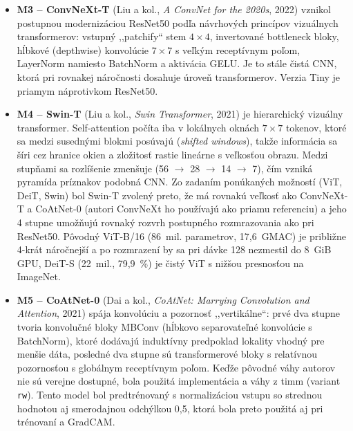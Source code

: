 \begin{itemize}
    \item \textbf{M3 -- ConvNeXt-T} (Liu a kol., \emph{A ConvNet for the
          2020s}, 2022) vznikol postupnou modernizáciou ResNet50 podľa
          návrhových princípov vizuálnych transformerov: vstupný
          ,,patchify`` stem $4\times4$, invertované bottleneck bloky,
          hĺbkové (depthwise) konvolúcie $7\times7$ s veľkým receptívnym
          poľom, LayerNorm namiesto BatchNorm a aktivácia GELU. Je to stále
          čistá CNN, ktorá pri rovnakej náročnosti dosahuje úroveň
          transformerov. Verzia Tiny je priamym náprotivkom ResNet50.
    \item \textbf{M4 -- Swin-T} (Liu a kol., \emph{Swin Transformer}, 2021)
          je hierarchický vizuálny transformer. Self-attention počíta iba
          v lokálnych oknách $7\times7$ tokenov, ktoré sa medzi
          susednými blokmi posúvajú (\emph{shifted windows}), takže
          informácia sa šíri cez hranice okien a zložitosť rastie lineárne
          s veľkosťou obrazu. Medzi stupňami sa rozlíšenie zmenšuje
          (56 $\rightarrow$ 28 $\rightarrow$ 14 $\rightarrow$ 7), čím vzniká
          pyramída príznakov podobná CNN. Zo zadaním ponúkaných možností
          (ViT, DeiT, Swin) bol Swin-T zvolený preto, že má rovnakú veľkosť
          ako ConvNeXt-T a CoAtNet-0 (autori ConvNeXt ho používajú ako
          priamu referenciu) a jeho 4 stupne umožňujú rovnaký rozvrh
          postupného rozmrazovania ako pri ResNet50. Pôvodný ViT-B/16
          (86~mil. parametrov, 17,6~GMAC) je približne 4-krát náročnejší a po
          rozmrazení by sa pri dávke 128 nezmestil do 8~GiB GPU, DeiT-S
          (22~mil., 79,9~\%) je čistý ViT s nižšou presnosťou na ImageNet.
    \item \textbf{M5 -- CoAtNet-0} (Dai a kol., \emph{CoAtNet: Marrying
          Convolution and Attention}, 2021) spája konvolúciu a pozornosť
          ,,vertikálne``: prvé dva stupne tvoria konvolučné bloky MBConv
          (hĺbkovo separovateľné konvolúcie s BatchNorm), ktoré dodávajú
          induktívny predpoklad lokality vhodný pre menšie dáta, posledné
          dva stupne sú transformerové bloky s relatívnou pozornosťou
          s globálnym receptívnym poľom. Keďže pôvodné váhy autorov nie sú
          verejne dostupné, bola použitá implementácia a váhy z timm
          (variant \texttt{rw}). Tento model bol predtrénovaný s normalizáciou
          vstupu so strednou hodnotou aj smerodajnou odchýlkou 0,5, ktorá
          bola preto použitá aj pri trénovaní a GradCAM.
\end{itemize}

